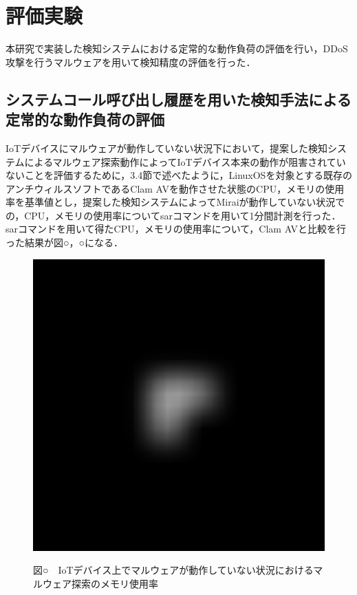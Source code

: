 \chapter{評価実験}
本研究で実装した検知システムにおける定常的な動作負荷の評価を行い，DDoS攻撃を行うマルウェアを用いて検知精度の評価を行った．

\section{システムコール呼び出し履歴を用いた検知手法による定常的な動作負荷の評価}

IoTデバイスにマルウェアが動作していない状況下において，提案した検知システムによるマルウェア探索動作によってIoTデバイス本来の動作が阻害されていないことを評価するために，3.4節で述べたように，LinuxOSを対象とする既存のアンチウィルスソフトであるClam AVを動作させた状態のCPU，メモリの使用率を基準値とし，提案した検知システムによってMiraiが動作していない状況での，CPU，メモリの使用率についてsarコマンドを用いて1分間計測を行った．
sarコマンドを用いて得たCPU，メモリの使用率について，Clam AVと比較を行った結果が図○，○になる．
 
\begin{figure}[h]
    \centering
       \includegraphics[width=120mm]{figures/test.eps}
    \label{fig:model}
        \begin{center}図○　IoTデバイス上でマルウェアが動作していない状況におけるマルウェア探索のメモリ使用率\end{center}
\end{figure}
  
